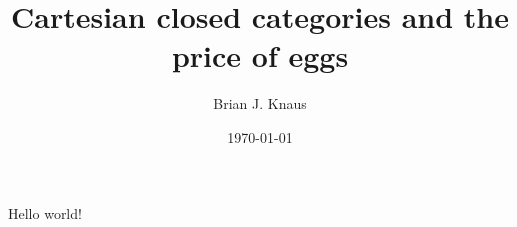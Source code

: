 \documentclass{article}
\title{Cartesian closed categories and the price of eggs}
\date{\today}
\author{Brian J. Knaus}
\begin{document}
   \maketitle
   Hello world!
\end{document}
